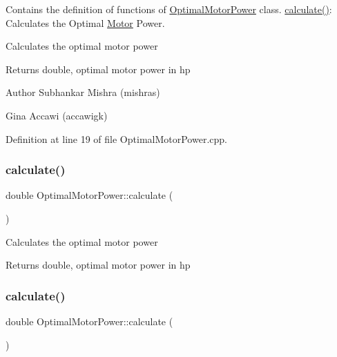 Contains the definition of functions of \hyperlink{class_optimal_motor_power}{Optimal\+Motor\+Power} class. \hyperlink{class_optimal_motor_power_a8db12b796c148e0130b261ae138057bf}{calculate()}\+: Calculates the Optimal \hyperlink{class_motor}{Motor} Power. 

Calculates the optimal motor power

\begin{DoxyReturn}{Returns}
double, optimal motor power in hp
\end{DoxyReturn}
\begin{DoxyAuthor}{Author}
Subhankar Mishra (mishras) 

Gina Accawi (accawigk) 
\end{DoxyAuthor}


Definition at line 19 of file Optimal\+Motor\+Power.\+cpp.

\mbox{\label{class_optimal_motor_power_a8db12b796c148e0130b261ae138057bf}} 
\subsubsection{\texorpdfstring{calculate()}{calculate()}\hspace{0.1cm}{\footnotesize\ttfamily [2/3]}}
{\footnotesize\ttfamily double Optimal\+Motor\+Power\+::calculate (\begin{DoxyParamCaption}{ }\end{DoxyParamCaption})}

Calculates the optimal motor power

\begin{DoxyReturn}{Returns}
double, optimal motor power in hp 
\end{DoxyReturn}
\mbox{\label{class_optimal_motor_power_a8db12b796c148e0130b261ae138057bf}} 
\subsubsection{\texorpdfstring{calculate()}{calculate()}\hspace{0.1cm}{\footnotesize\ttfamily [3/3]}}
{\footnotesize\ttfamily double Optimal\+Motor\+Power\+::calculate (\begin{DoxyParamCaption}{ }\end{DoxyParamCaption})}

